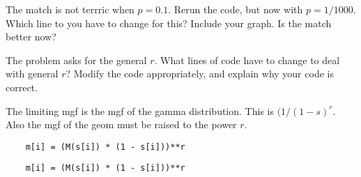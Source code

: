 \begin{exercise}
The match is not terrric when $p=0.1$. Rerun the code, but now with $p=1/1000$. Which line to you have to change for this? Include your graph. Is the match better now?
\end{exercise}

\begin{exercise}
The problem asks for the general $r$. What lines of code have to change to deal with general $r$? Modify the code appropriately, and explain why your code is correct.
\begin{solution}
The limiting mgf is the mgf of the gamma distribution. This is $(1/(1-s)^{r}$. Also the mgf of the geom must be raised to the power $r$.
\begin{verbatim}
    m[i] = (M(s[i]) * (1 - s[i]))**r
\end{verbatim}

\begin{verbatim}
    m[i] = (M(s[i]) * (1 - s[i]))**r
\end{verbatim}
\end{solution}
\end{exercise}
